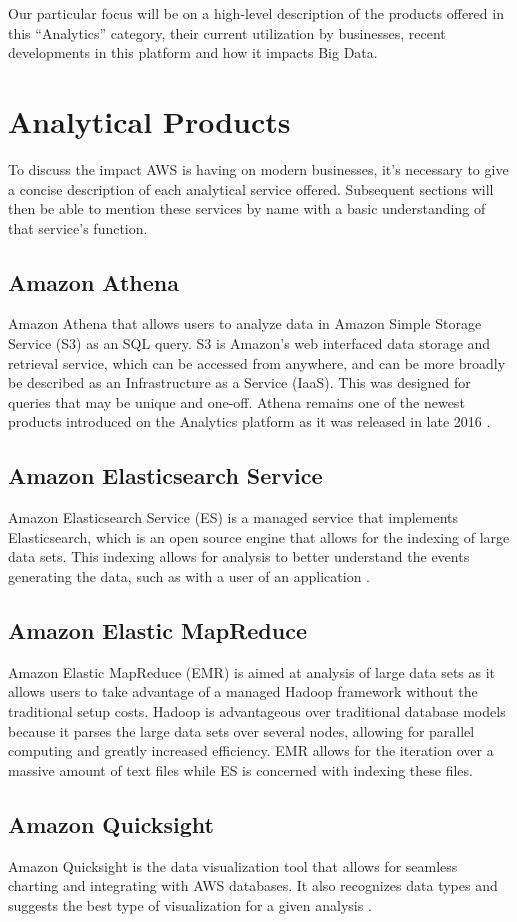 \documentclass[sigconf]{acmart}
\begin{document}
Our particular focus will be on a high-level description of the products offered in this ``Analytics'' category, their current utilization by businesses, recent developments in this platform and how it impacts Big Data.

\section{Analytical Products}
To discuss the impact AWS is having on modern businesses, it's necessary to give a concise description of each analytical service offered. Subsequent sections will then be able to mention these services by name with a basic understanding of that service's function. 
\subsection{Amazon Athena}
Amazon Athena that allows users to analyze data in Amazon Simple Storage Service (S3) as an SQL query. S3 is Amazon's web interfaced data storage and retrieval service, which can be accessed from anywhere, and can be more broadly be described as an Infrastructure as a Service (IaaS). This was designed for queries that may be unique and one-off. Athena remains one of the newest products introduced on the Analytics platform as it was released in late 2016 \cite{athena}.
\subsection{Amazon Elasticsearch Service}
Amazon Elasticsearch Service (ES) is a managed service that implements  Elasticsearch, which is an open source engine that allows for the indexing of large data sets. This indexing allows for analysis to better understand the events generating the data, such as with a user of an application \cite{elastic}.
\subsection{Amazon Elastic MapReduce}
Amazon Elastic MapReduce (EMR) is aimed at analysis of large data sets as it allows users to take advantage of a managed Hadoop framework without the traditional setup costs. Hadoop is advantageous over traditional database models because it parses the large data sets over several nodes, allowing for parallel computing and greatly increased efficiency. EMR allows for the iteration over a massive amount of text files while ES is concerned with indexing these files\cite{emr}. 
\subsection{Amazon Quicksight}
Amazon Quicksight is the data visualization tool that allows for seamless charting and integrating with AWS databases. It also recognizes data types and suggests the best type of visualization for a given analysis \cite{quicksight}. 
\end{document}
